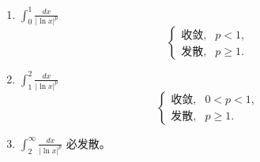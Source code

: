 \begin{enumerate}
    \item $\displaystyle \int_{0}^{1}\frac{dx}{|\ln x|^{p}}$
          \[
              \begin{cases}
                  \text{收敛}, & p<1,    \\
                  \text{发散}, & p\ge 1.
              \end{cases}
          \]

    \item $\displaystyle \int_{1}^{2}\frac{dx}{|\ln x|^{p}}$
          \[
              \begin{cases}
                  \text{收敛}, & 0<p<1,  \\
                  \text{发散}, & p\ge 1.
              \end{cases}
          \]

    \item $\displaystyle \int_{2}^{\infty}\frac{dx}{|\ln x|^{p}}$ 必发散。
\end{enumerate}